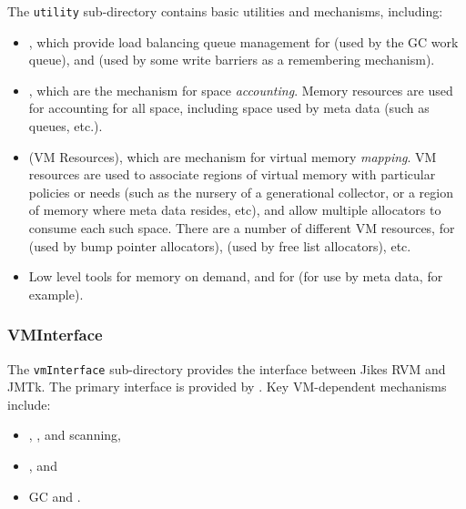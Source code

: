 The \texttt{utility} sub-directory contains basic utilities and
mechanisms, including:
\begin{itemize}
\item {}, which provide load balancing queue
  management for  (used by
  the GC work queue), and  (used by some write barriers as a
  remembering mechanism).
\item {}, which are the
  mechanism for space \emph{accounting}.  Memory resources are used
  for accounting for all space, including space used by meta data
  (such as queues, etc.).
\item {} (VM
  Resources), which are mechanism for virtual memory \emph{mapping}.
  VM resources are used to associate regions of virtual memory with
  particular policies or needs (such as the nursery of a generational
  collector, or a region of memory where meta data resides, etc), and
  allow multiple allocators to consume each such space. There are a
  number of different VM resources, for  (used by bump pointer
  allocators), 
  (used by free list allocators), etc.
\item Low level tools for 
  memory on demand, and for  (for use by meta data, for example).
\end{itemize}

\subsubsection{VMInterface} \label{sssec:vminterface}

The \texttt{vmInterface} sub-directory provides the interface between
Jikes RVM and JMTk.  The primary interface is provided by
.  Key
VM-dependent mechanisms include:

\begin{itemize}
\item {},
  , and
   scanning,
\item {}, and
\item GC  and .
\end{itemize}

